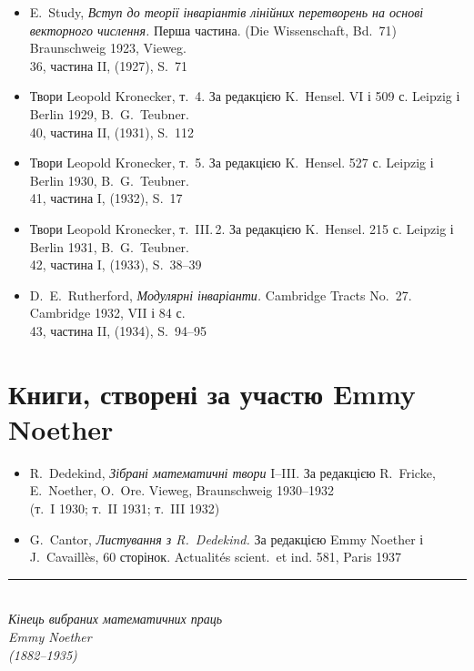 \documentclass[11pt]{article}
\newcommand{\foreign}[1]{#1}
\begin{document}
\begin{itemize}[leftmargin=1.5em,itemsep=0.2em]
\item E.\ Study, \textit{Вступ до теорії інваріантів лінійних перетворень на основі векторного числення.} Перша частина. (\foreign{Die Wissenschaft}, Bd.~71) Braunschweig 1923, Vieweg.\\
36, частина II, (1927), S.~71

\item Твори Leopold Kronecker, т.~4. За редакцією K.\ Hensel. VI і 509 с. Leipzig і Berlin 1929, B.\ G.\ Teubner.\\
40, частина II, (1931), S.~112

\item Твори Leopold Kronecker, т.~5. За редакцією K.\ Hensel. 527 с. Leipzig і Berlin 1930, B.\ G.\ Teubner.\\
41, частина I, (1932), S.~17

\item Твори Leopold Kronecker, т.~III.\,2. За редакцією K.\ Hensel. 215 с. Leipzig і Berlin 1931, B.\ G.\ Teubner.\\
42, частина I, (1933), S.~38--39

\item D.\ E.\ Rutherford, \textit{Модулярні інваріанти.} \foreign{Cambridge Tracts No.~27.} Cambridge 1932, VII і 84 с.\\
43, частина II, (1934), S.~94--95
\end{itemize}

\newpage
\section*{Книги, створені за участю Emmy Noether}

\begin{itemize}[leftmargin=1.5em,itemsep=0.5em]
\item R.\ Dedekind, \textit{Зібрані математичні твори} I--III. За редакцією R.\ Fricke, E.\ Noether, O.\ Ore. Vieweg, Braunschweig 1930--1932\\
(т.~I 1930; т.~II 1931; т.~III 1932)

\item G.\ Cantor, \textit{Листування з R.\ Dedekind.} За редакцією Emmy Noether і J.\ Cavaillès, 60 сторінок. \foreign{Actualités scient.\ et ind.} 581, Paris 1937
\end{itemize}

\vfill

\begin{center}
\rule{0.5\textwidth}{0.4pt}\\[1em]
\textit{Кінець вибраних математичних праць}\\[0.5em]
\textit{Emmy Noether}\\[0.5em]
\textit{(1882--1935)}
\end{center}
\end{document}
